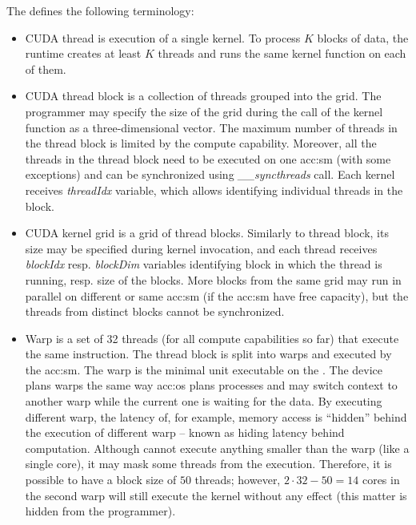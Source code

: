 The \cuda defines the following terminology:
\begin{itemize}
    \item CUDA thread is execution of a single kernel. To process $K$ blocks of data, the runtime creates at least $K$ threads and runs the same kernel function on each of them.
    \item CUDA thread block is a collection of threads grouped into the grid. The programmer may specify the size of the grid during the call of the kernel function as a three-dimensional vector. The maximum number of threads in the thread block is limited by the compute capability. Moreover, all the threads in the thread block need to be executed on one \acrshort{acc:sm} (with some exceptions) and can be synchronized using \textit{\_\_syncthreads} call. Each kernel receives \textit{threadIdx} variable, which allows identifying individual threads in the block.
    \item CUDA kernel grid is a grid of thread blocks. Similarly to thread block, its size may be specified during kernel invocation, and each thread receives \textit{blockIdx} resp. \textit{blockDim} variables identifying block in which the thread is running, resp. size of the blocks. More blocks from the same grid may run in parallel on different or same \acrshort{acc:sm} (if the \acrshort{acc:sm} have free capacity), but the threads from distinct blocks cannot be synchronized.
    \item Warp is a set of 32 threads (for all compute capabilities so far) that execute the same instruction. The thread block is split into warps and executed by the \acrshort{acc:sm}. The warp is the minimal unit executable on the \gpu. The device plans warps the same way \acrshort{acc:os} plans processes and may switch context to another warp while the current one is waiting for the data. By executing different warp, the latency of, for example, memory access is \enquote{hidden} behind the execution of different warp -- known as hiding latency behind computation. Although \gpu cannot execute anything smaller than the warp (like a single core), it may mask some threads from the execution. Therefore, it is possible to have a block size of $50$ threads; however, $2\cdot32 - 50=14$ cores in the second warp will still execute the kernel without any effect (this matter is hidden from the programmer).
\end{itemize}

